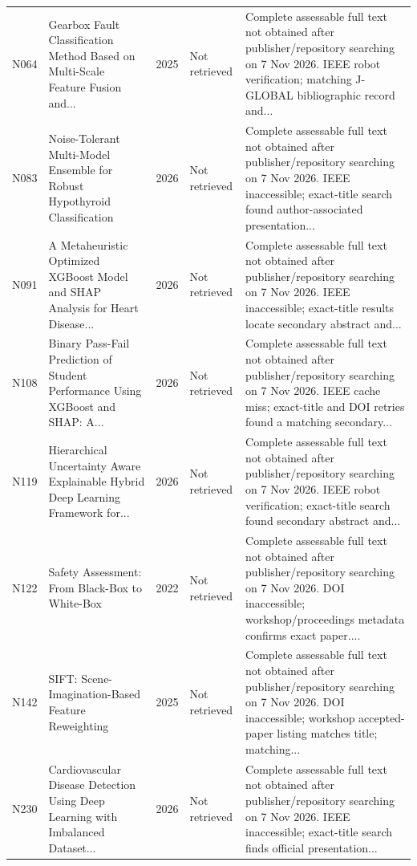 \begin{longtable}{@{}P{1.0cm}P{6.3cm}P{0.7cm}P{1.6cm}P{6.1cm}@{}}
N064 & Gearbox Fault Classification Method Based on Multi-Scale Feature Fusion and... & 2025 & Not retrieved & Complete assessable full text not obtained after publisher/\allowbreak{}repository searching on 7 Nov 2026. IEEE robot verification; matching J-GLOBAL bibliographic record and... \\
N083 & Noise-Tolerant Multi-Model Ensemble for Robust Hypothyroid Classification & 2026 & Not retrieved & Complete assessable full text not obtained after publisher/\allowbreak{}repository searching on 7 Nov 2026. IEEE inaccessible; exact-title search found author-associated presentation... \\
N091 & A Metaheuristic Optimized XGBoost Model and SHAP Analysis for Heart Disease... & 2026 & Not retrieved & Complete assessable full text not obtained after publisher/\allowbreak{}repository searching on 7 Nov 2026. IEEE inaccessible; exact-title results locate secondary abstract and... \\
N108 & Binary Pass-Fail Prediction of Student Performance Using XGBoost and SHAP: A... & 2026 & Not retrieved & Complete assessable full text not obtained after publisher/\allowbreak{}repository searching on 7 Nov 2026. IEEE cache miss; exact-title and DOI retries found a matching secondary... \\
N119 & Hierarchical Uncertainty Aware Explainable Hybrid Deep Learning Framework for... & 2026 & Not retrieved & Complete assessable full text not obtained after publisher/\allowbreak{}repository searching on 7 Nov 2026. IEEE robot verification; exact-title search found secondary abstract and... \\
N122 & Safety Assessment: From Black-Box to White-Box & 2022 & Not retrieved & Complete assessable full text not obtained after publisher/\allowbreak{}repository searching on 7 Nov 2026. DOI inaccessible; workshop/\allowbreak{}proceedings metadata confirms exact paper.... \\
N142 & SIFT: Scene-Imagination-Based Feature Reweighting & 2025 & Not retrieved & Complete assessable full text not obtained after publisher/\allowbreak{}repository searching on 7 Nov 2026. DOI inaccessible; workshop accepted-paper listing matches title; matching... \\
N230 & Cardiovascular Disease Detection Using Deep Learning with Imbalanced Dataset... & 2026 & Not retrieved & Complete assessable full text not obtained after publisher/\allowbreak{}repository searching on 7 Nov 2026. IEEE inaccessible; exact-title search finds official presentation... \\

\end{longtable}
